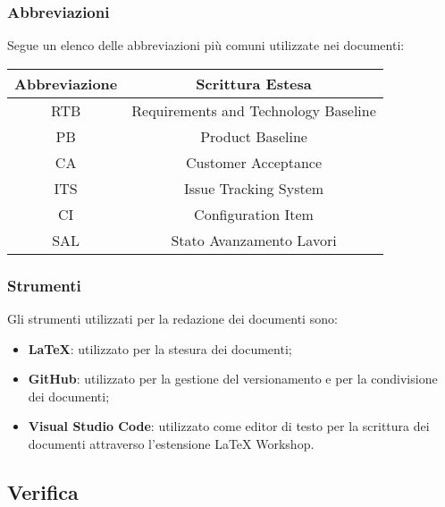 \subsubsection{Abbreviazioni}
Segue un elenco delle abbreviazioni più comuni utilizzate nei documenti:
\begin{center}
    \begin{tabular}{|c|c|}
    \hline
    \textbf{Abbreviazione} & \textbf{Scrittura Estesa} \\
    \hline
    RTB & Requirements and Technology Baseline \\
    PB & Product Baseline \\
    CA & Customer Acceptance \\
    ITS & Issue Tracking System \\
    CI & Configuration Item \\
    SAL & Stato Avanzamento Lavori \\
    \hline
    \end{tabular}
\end{center}

\subsubsection{Strumenti}
Gli strumenti utilizzati per la redazione dei documenti sono:
\begin{itemize}
    \item \textbf{\LaTeX{}}: utilizzato per la stesura dei documenti;
    \item \textbf{GitHub}: utilizzato per la gestione del versionamento e per la condivisione dei documenti;
    \item \textbf{Visual Studio Code}: utilizzato come editor di testo per la scrittura dei documenti attraverso l'estensione \LaTeX{} Workshop.
\end{itemize}

\subsection{Verifica}
